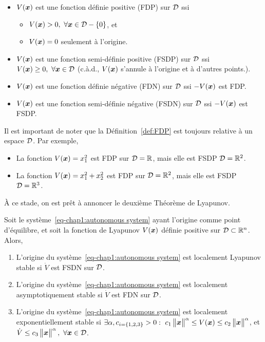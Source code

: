 \begin{definition}\label{def:FDP}
	\begin{itemize}
		\item $V(\bm{x})$ est une fonction définie positive (FDP) sur ${\cal D}$ ssi 
		\begin{itemize}
			\item $V(\bm{x})>0, \ \forall \bm{x}\in{\cal D}-\left\{0\right\}$, et
			\item $V(\bm{x})=0$ seulement à l'origine.
		\end{itemize}
		\item $V(\bm{x})$ est une fonction semi-définie positive (FSDP) sur ${\cal D}$ ssi $V(\bm{x})\geq0, \ \forall \bm{x}\in{\cal D}$ (c.à.d., $V(\bm{x})$ s'annule à l'origine et à d'autres points.).
		\item $V(\bm{x})$ est une fonction définie négative (FDN) sur ${\cal D}$ ssi  $-V(\bm{x})$ est FDP.
		\item $V(\bm{x})$ est une fonction semi-définie négative (FSDN) sur ${\cal D}$ ssi  $-V(\bm{x})$ est FSDP.
	\end{itemize}
\end{definition} 
Il est important de noter que la Définition~\ref{def:FDP} est toujours relative à un espace ${\cal D}$. Par exemple, 
\begin{itemize}
	\item La fonction $V(\bm{x}) = x_1^2$ est FDP sur ${\cal D}=\mathbb{R}$, mais elle est FSDP ${\cal D}=\mathbb{R}^2$.
	\item La fonction $V(\bm{x}) = x_1^2 + x_2^2$ est FDP sur ${\cal D}=\mathbb{R}^2$, mais elle est FSDP ${\cal D}=\mathbb{R}^3$.
\end{itemize}
À ce stade, on est prêt à annoncer le deuxième Théorème de Lyapunov.
\begin{theoreme}\label{thm:direct lyapunov method}
	Soit le système~\eqref{eq-chap1:autonomous system} ayant l'origine comme point d'équilibre, et soit la fonction de Lyapunov $V(\bm{x})$ définie positive sur ${\cal D}\subset\mathbb{R}^n$. Alors, 
	\begin{enumerate}
		\item L'origine du système~\eqref{eq-chap1:autonomous system} est localement Lyapunov stable si $\dot{V}$ est FSDN sur ${\cal D}$.
		\item L'origine du système~\eqref{eq-chap1:autonomous system} est localement asymptotiquement stable si $\dot{V}$ est FDN sur ${\cal D}$.
		\item L'origine du système~\eqref{eq-chap1:autonomous system} est localement exponentiellement stable si $\exists\alpha,c_{{i=\left\{1,2,3\right\}}}>0:\ c_1\norm{\state}^\alpha\leq V(\state)\leq c_2\norm{\state}^\alpha$, et $ \dot{V}\leq c_3\norm{\state}^\alpha, \ \forall\state\in\setD$.
	\end{enumerate}
\end{theoreme}

